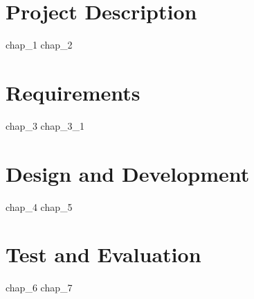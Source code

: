 \documentclass[a4paper, 11pt, oneside, draft]{memoir}
\theoremstyle{plain}
\theoremstyle{plain}
\theoremstyle{plain}
\theoremstyle{definition}
\theoremstyle{plain}
\theoremstyle{plain}
\theoremstyle{plain}
\begin{document}
	\frontmatter
	
	\clearpage
	\tableofcontents*
	\clearpage
	\listoftables
	\listoffigures
	\clearpage

	\mainmatter
	\part{Project Description}
	{chap_1} %
	{chap_2} %
	\part{Requirements}
	{chap_3} %
	{chap_3_1}
	\part{Design and Development}
	{chap_4} %
	{chap_5} %
	\part{Test and Evaluation}
	{chap_6} %
	{chap_7} %

%
	\backmatter
	\printindex
	\renewcommand{\bibname}{References}
	
\end{document}
